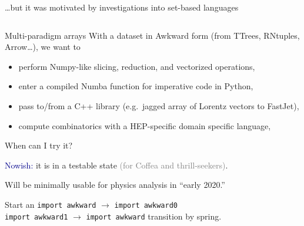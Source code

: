 \documentclass[aspectratio=169]{beamer}
\begin{document}
\begin{frame}[fragile]{\ldots but it was motivated by investigations into set-based languages}
\begin{columns}
\large
{}
\end{columns}
\end{frame}

\begin{frame}{Multi-paradigm arrays}
\large
\vspace{0.75 cm}
With a dataset in Awkward form (from TTrees, RNtuples, Arrow\ldots), we want to

\vspace{0.25 cm}
\begin{itemize}\setlength{\itemsep}{0.25 cm}
\item<2-> perform Numpy-like slicing, reduction, and vectorized operations,
\item<3-> enter a compiled Numba function for imperative code in Python,
\item<4-> pass to/from a C++ library (e.g.\ jagged array of Lorentz vectors to FastJet),
\item<5-> compute combinatorics with a HEP-specific domain specific language,
\end{itemize}

\vspace{0.25 cm}

\vspace{0.5 cm}
\begin{center}
\end{center}
\end{frame}

\begin{frame}{When can I try it?}
\Large
\begin{center}
\textcolor{darkblue}{Nowish:} it is in a testable state \textcolor{gray}{(for Coffea and thrill-seekers)}.

\vspace{1 cm}
Will be minimally usable for physics analysis in ``early 2020.''

\vspace{1 cm}
\end{center}

Start an {\normalsize \texttt{import awkward}} $\to$ {\normalsize \texttt{import awkward0}} \\
\phantom{Start an} {\normalsize \texttt{import awkward1}} $\to$ {\normalsize \texttt{import awkward}} transition by spring.
\end{frame}
\end{document}
